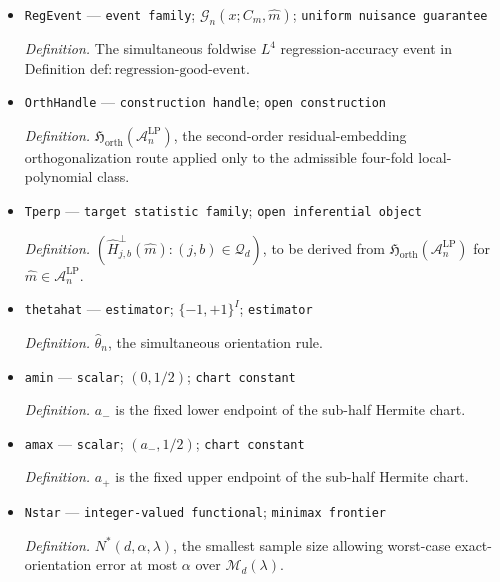\documentclass{article}
\begin{document}
\begin{itemize}
  \par\smallskip\noindent\emph{Definition.} \(\mathcal A_n^{\mathrm{LP}}\), the admissible foldwise local-polynomial regression class fixed by Definition \(\mathrm{def:admissible\text{-}local\text{-}polynomial\text{-}class}\).
  \item \texttt{RegEvent} --- \texttt{event family}; \(\mathcal G_n(x;C_m,\widehat m)\); \texttt{uniform nuisance guarantee}
  \par\smallskip\noindent\emph{Definition.} The simultaneous foldwise \(L^4\) regression-accuracy event in Definition \(\mathrm{def:regression\text{-}good\text{-}event}\).
  \item \texttt{OrthHandle} --- \texttt{construction handle}; \texttt{open construction}
  \par\smallskip\noindent\emph{Definition.} \(\mathfrak H_{\mathrm{orth}}(\mathcal A_n^{\mathrm{LP}})\), the second-order residual-embedding orthogonalization route applied only to the admissible four-fold local-polynomial class.
  \item \texttt{Tperp} --- \texttt{target statistic family}; \texttt{open inferential object}
  \par\smallskip\noindent\emph{Definition.} \((\widehat H^{\perp}_{j,b}(\widehat m):(j,b)\in\mathcal Q_d)\), to be derived from \(\mathfrak H_{\mathrm{orth}}(\mathcal A_n^{\mathrm{LP}})\) for \(\widehat m\in\mathcal A_n^{\mathrm{LP}}\).
  \item \texttt{thetahat} --- \texttt{estimator}; \(\{-1,+1\}^I\); \texttt{estimator}
  \par\smallskip\noindent\emph{Definition.} \(\widehat\theta_n\), the simultaneous orientation rule.
  \item \texttt{amin} --- \texttt{scalar}; \((0,1/2)\); \texttt{chart constant}
  \par\smallskip\noindent\emph{Definition.} \(a_-\) is the fixed lower endpoint of the sub-half Hermite chart.
  \item \texttt{amax} --- \texttt{scalar}; \((a_-,1/2)\); \texttt{chart constant}
  \par\smallskip\noindent\emph{Definition.} \(a_+\) is the fixed upper endpoint of the sub-half Hermite chart.
  \item \texttt{Nstar} --- \texttt{integer-\allowbreak{}valued functional}; \texttt{minimax frontier}
  \par\smallskip\noindent\emph{Definition.} \(N^*(d,\alpha,\lambda)\), the smallest sample size allowing worst-case exact-orientation error at most \(\alpha\) over \(\mathcal M_d(\lambda)\).

\end{itemize}
\end{document}
